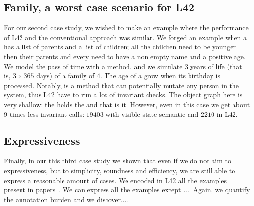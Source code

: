 \subsection{Family, a worst case scenario for L42}
For our second case study, we wished to make an example where the performance of L42 and the conventional approach was similar. We forged an example when a \Q@Family@ has a list of parents and a list of children;
all the children need to be younger then their parents and every \Q@Person@ need to have a non empty name and a positive age.  
We model the pass of time with a \Q@processDay@ method, and we simulate $3$ years of life (that is, $3\times365$ days) of a family of $4$.
The age of a \Q@Person@ grow when its birthday is processed.
Notably, \Q@processDay@ is a \Q@mut@ method that can potentially mutate any person in the system, thus
L42 have to run a lot of invariant checks. The object graph here is very shallow: the \Q@Family@ holds the \Q@Person@s and that is it.
However, even in this case we get about $9$ times less invariant calls: $19403$ with visible state semantic  and $2210$ in L42.

\subsection{Expressiveness}
Finally, in our this third case study we 
shown that even if we do not aim to expressiveness, but to simplicity, soundness and efficiency, we are still able to express a reasonable amount of cases.
We encoded in L42 all the examples present in papers~\cite{??}.
We can express all the examples except ....
Again, we quantify the annotation burden and we discover....



